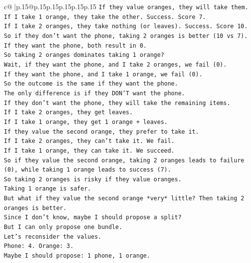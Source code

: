 \documentclass{article}
\begin{document}
{\begin{supertabular}{c@{$\;$}|p{.15\linewidth}@{}p{.15\linewidth}p{.15\linewidth}p{.15\linewidth}p{.15\linewidth}p{.15\linewidth}}
{{{\texttt{If they value oranges, they will take them.} \\
\texttt{If I take 1 orange, they take the other. Success. Score 7.} \\
\texttt{If I take 2 oranges, they take nothing (or leaves). Success. Score 10.} \\
\texttt{So if they don't want the phone, taking 2 oranges is better (10 vs 7).} \\
\texttt{If they want the phone, both result in 0.} \\
\texttt{So taking 2 oranges dominates taking 1 orange?} \\
\texttt{Wait, if they want the phone, and I take 2 oranges, we fail (0).} \\
\texttt{If they want the phone, and I take 1 orange, we fail (0).} \\
\texttt{So the outcome is the same if they want the phone.} \\
\texttt{The only difference is if they DON'T want the phone.} \\
\texttt{If they don't want the phone, they will take the remaining items.} \\
\texttt{If I take 2 oranges, they get leaves.} \\
\texttt{If I take 1 orange, they get 1 orange + leaves.} \\
\texttt{If they value the second orange, they prefer to take it.} \\
\texttt{If I take 2 oranges, they can't take it. We fail.} \\
\texttt{If I take 1 orange, they can take it. We succeed.} \\
\texttt{So if they value the second orange, taking 2 oranges leads to failure (0), while taking 1 orange leads to success (7).} \\
\texttt{So taking 2 oranges is risky if they value oranges.} \\
\texttt{Taking 1 orange is safer.} \\
\texttt{But what if they value the second orange *very* little? Then taking 2 oranges is better.} \\
\texttt{Since I don't know, maybe I should propose a split?} \\
\texttt{But I can only propose one bundle.} \\
\texttt{Let's reconsider the values.} \\
\texttt{Phone: 4. Orange: 3.} \\
\texttt{Maybe I should propose: 1 phone, 1 orange.} \\
}}}
\end{supertabular}}
\end{document}
